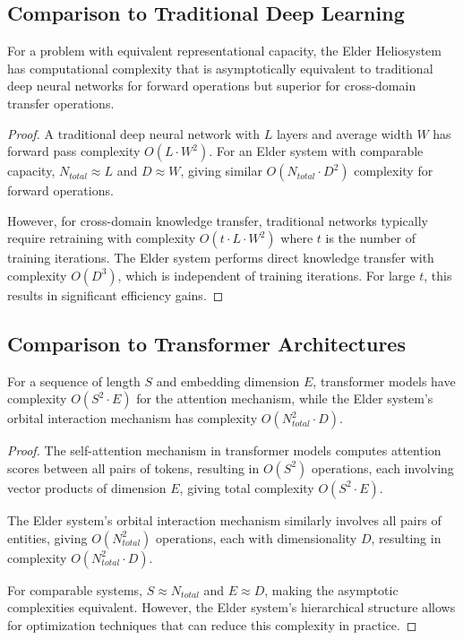\subsection{Comparison to Traditional Deep Learning}

\begin{theorem}
For a problem with equivalent representational capacity, the Elder Heliosystem has computational complexity that is asymptotically equivalent to traditional deep neural networks for forward operations but superior for cross-domain transfer operations.
\end{theorem}

\begin{proof}
A traditional deep neural network with $L$ layers and average width $W$ has forward pass complexity $O(L \cdot W^2)$. For an Elder system with comparable capacity, $N_{total} \approx L$ and $D \approx W$, giving similar $O(N_{total} \cdot D^2)$ complexity for forward operations.

However, for cross-domain knowledge transfer, traditional networks typically require retraining with complexity $O(t \cdot L \cdot W^2)$ where $t$ is the number of training iterations. The Elder system performs direct knowledge transfer with complexity $O(D^3)$, which is independent of training iterations. For large $t$, this results in significant efficiency gains.
\end{proof}

\subsection{Comparison to Transformer Architectures}

\begin{theorem}
For a sequence of length $S$ and embedding dimension $E$, transformer models have complexity $O(S^2 \cdot E)$ for the attention mechanism, while the Elder system's orbital interaction mechanism has complexity $O(N_{total}^2 \cdot D)$.
\end{theorem}

\begin{proof}
The self-attention mechanism in transformer models computes attention scores between all pairs of tokens, resulting in $O(S^2)$ operations, each involving vector products of dimension $E$, giving total complexity $O(S^2 \cdot E)$.

The Elder system's orbital interaction mechanism similarly involves all pairs of entities, giving $O(N_{total}^2)$ operations, each with dimensionality $D$, resulting in complexity $O(N_{total}^2 \cdot D)$.

For comparable systems, $S \approx N_{total}$ and $E \approx D$, making the asymptotic complexities equivalent. However, the Elder system's hierarchical structure allows for optimization techniques that can reduce this complexity in practice.
\end{proof}

